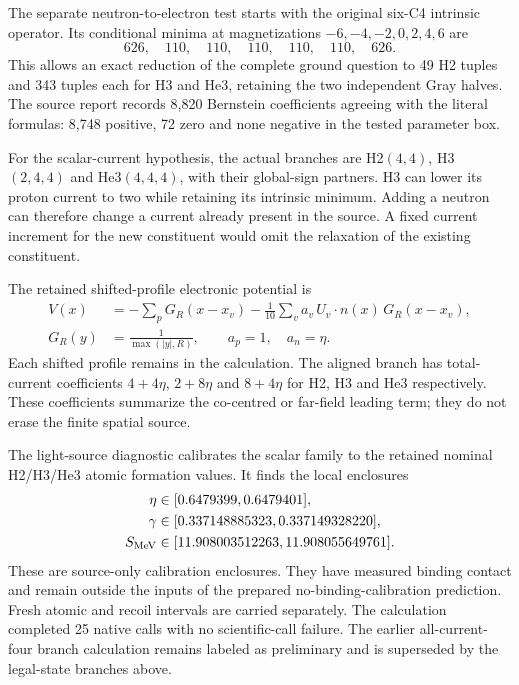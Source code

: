 The separate neutron-to-electron test starts with the original six-C4 intrinsic operator. Its conditional minima at magnetizations $-6,-4,-2,0,2,4,6$ are
\begin{equation}
626,\quad110,\quad110,\quad110,\quad110,\quad110,\quad626.
\end{equation}
This allows an exact reduction of the complete ground question to 49 H2 tuples and 343 tuples each for H3 and He3, retaining the two independent Gray halves. The source report records 8,820 Bernstein coefficients agreeing with the literal formulas: 8,748 positive, 72 zero and none negative in the tested parameter box.

For the scalar-current hypothesis, the actual branches are H2$(4,4)$, H3$(2,4,4)$ and He3$(4,4,4)$, with their global-sign partners. H3 can lower its proton current to two while retaining its intrinsic minimum. Adding a neutron can therefore change a current already present in the source. A fixed current increment for the new constituent would omit the relaxation of the existing constituent.

The retained shifted-profile electronic potential is
\begin{align}
V(x)&=-\sum_{p}G_R(x-x_v)
-\frac1{10}\sum_v a_v\,U_v\!\cdot n(x)\,G_R(x-x_v),\\
G_R(y)&=\frac1{\max(|y|,R)},\qquad a_p=1,\quad a_n=\eta.
\end{align}
Each shifted profile remains in the calculation. The aligned branch has total-current coefficients $4+4\eta$, $2+8\eta$ and $8+4\eta$ for H2, H3 and He3 respectively. These coefficients summarize the co-centred or far-field leading term; they do not erase the finite spatial source.

The light-source diagnostic calibrates the scalar family to the retained nominal H2/H3/He3 atomic formation values. It finds the local enclosures
\begin{align}
\eta&\in[0.6479399,0.6479401],\\
\gamma&\in[0.337148885323,0.337149328220],\\
S_{\rm MeV}&\in[11.908003512263,11.908055649761].
\end{align}
These are source-only calibration enclosures. They have measured binding contact and remain outside the inputs of the prepared no-binding-calibration prediction. Fresh atomic and recoil intervals are carried separately. The calculation completed 25 native calls with no scientific-call failure. The earlier all-current-four branch calculation remains labeled as preliminary and is superseded by the legal-state branches above.

